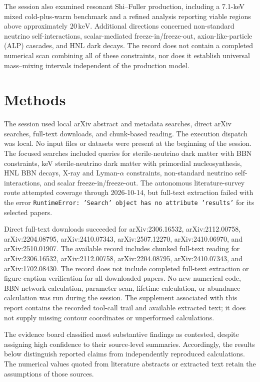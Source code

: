 \documentclass[11pt,a4paper]{article}
\begin{document}
The session also examined resonant Shi--Fuller production, including a 7.1-keV mixed cold-plus-warm benchmark and a refined analysis reporting viable regions above approximately \(20\,\mathrm{keV}\). Additional directions concerned non-standard neutrino self-interactions, scalar-mediated freeze-in/freeze-out, axion-like-particle (ALP) cascades, and HNL dark decays. The record does not contain a completed numerical scan combining all of these constraints, nor does it establish universal mass--mixing intervals independent of the production model.

\section{Methods}

The session used local arXiv abstract and metadata searches, direct arXiv searches, full-text downloads, and chunk-based reading. The execution dispatch was local. No input files or datasets were present at the beginning of the session. The focused searches included queries for sterile-neutrino dark matter with BBN constraints, keV sterile-neutrino dark matter with primordial nucleosynthesis, HNL BBN decays, X-ray and Lyman-\(\alpha\) constraints, non-standard neutrino self-interactions, and scalar freeze-in/freeze-out. The autonomous literature-survey route attempted coverage through 2026-10-14, but full-text extraction failed with the error \texttt{RuntimeError: 'Search' object has no attribute 'results'} for its selected papers.

Direct full-text downloads succeeded for arXiv:2306.16532, arXiv:2112.00758, arXiv:2204.08795, arXiv:2410.07343, arXiv:2507.12270, arXiv:2410.06970, and arXiv:2510.01907. The available record includes chunked full-text reading for arXiv:2306.16532, arXiv:2112.00758, arXiv:2204.08795, arXiv:2410.07343, and arXiv:1702.08430. The record does not include completed full-text extraction or figure-caption verification for all downloaded papers. No new numerical code, BBN network calculation, parameter scan, lifetime calculation, or abundance calculation was run during the session. The supplement associated with this report contains the recorded tool-call trail and available extracted text; it does not supply missing contour coordinates or unperformed calculations.

The evidence board classified most substantive findings as contested, despite assigning high confidence to their source-level summaries. Accordingly, the results below distinguish reported claims from independently reproduced calculations. The numerical values quoted from literature abstracts or extracted text retain the assumptions of those sources.
\end{document}
